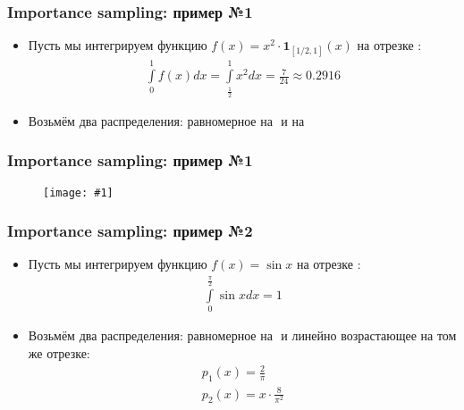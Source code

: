 \documentclass[10pt]{beamer}
\newcommand{\slideimage}[1]{
  \begin{figure}
    \begin{adjustbox}{width=\textwidth, totalheight=\textheight-2\baselineskip-2\baselineskip,keepaspectratio}
      \texttt{[image: \#1]}
    \end{adjustbox}
  \end{figure}
}
\begin{document}
\begin{frame}
\frametitle{Importance sampling: пример №1}
\begin{itemize}
\item Пусть мы интегрируем функцию \begin{math}f(x) = x^2 \cdot \mathbf{1}_{[1/2, 1]}(x)\end{math} на отрезке \begin{math}[0, 1]\end{math}:
\begin{gather*}
\int\limits_0^1f(x)dx = \int\limits_\frac{1}{2}^1 x^2dx = \frac{7}{24}\approx 0.2916
\end{gather*}
\pause
\item Возьмём два распределения: равномерное на \begin{math}[0, 1]\end{math} и на \begin{math}[1/2. 1]\end{math}
\end{itemize}
\end{frame}

\begin{frame}
\frametitle{Importance sampling: пример №1}
\slideimage{is_plot_1.png}
\end{frame}

\begin{frame}
\frametitle{Importance sampling: пример №2}
\begin{itemize}
\item Пусть мы интегрируем функцию \begin{math}f(x) = \sin x\end{math} на отрезке \begin{math}[0, \frac{\pi}{2}]\end{math}:
\begin{gather*}
\int\limits_0^\frac{\pi}{2} \sin x dx = 1
\end{gather*}
\pause
\item Возьмём два распределения: равномерное на \begin{math}[0, \frac{\pi}{2}]\end{math} и линейно возрастающее на том же отрезке:
\begin{gather*}
p_1(x) = \frac{2}{\pi} \\
p_2(x) = x \cdot \frac{8}{\pi^2} \\
\end{gather*}
\end{itemize}
\end{frame}
\end{document}
